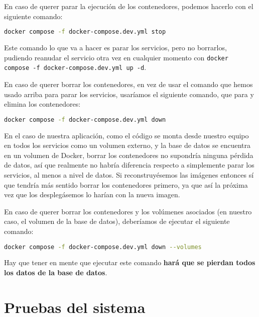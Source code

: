 En caso de querer parar la ejecución de los contenedores, podemos hacerlo con el siguiente comando:

\begin{lstlisting}[language=Bash]
  docker compose -f docker-compose.dev.yml stop
\end{lstlisting}


Este comando lo que va a hacer es parar los servicios, pero no borrarlos, pudiendo reanudar el servicio otra vez en cualquier momento con \verb,docker compose -f docker-compose.dev.yml up -d,.


En caso de querer borrar los contenedores, en vez de usar el comando que hemos usado arriba para parar los servicios, usaríamos el siguiente comando, que para y elimina los contenedores:

\begin{lstlisting}[language=Bash]
  docker compose -f docker-compose.dev.yml down
\end{lstlisting}



En el caso de nuestra aplicación, como el código se monta desde nuestro equipo en todos los servicios como un volumen externo, y la base de datos se encuentra en un volumen de Docker, borrar los contenedores no supondría ninguna pérdida de datos, así que realmente no habría diferencia respecto a simplemente parar los servicios, al menos a nivel de datos. Si reconstruyésemos las imágenes entonces sí que tendría más sentido borrar los contenedores primero, ya que así la próxima vez que los desplegásemos lo harían con la nueva imagen.


En caso de querer borrar los contenedores y los volúmenes asociados (en nuestro caso, el volumen de la base de datos), deberíamos de ejecutar el siguiente comando:

\begin{lstlisting}[language=Bash]
  docker compose -f docker-compose.dev.yml down --volumes
\end{lstlisting}


Hay que tener en mente que ejecutar este comando \textbf{hará que se pierdan todos los datos de la base de datos}.

\section{Pruebas del sistema}
